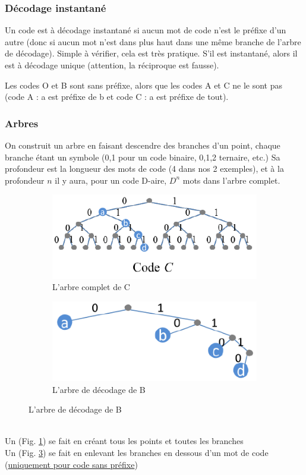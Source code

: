\documentclass[11pt,a4paper]{article}
\begin{document}
\subsubsection{Décodage instantané}
Un code est à décodage instantané si aucun mot de code n'est le préfixe d'un autre (donc si aucun mot n'est dans plus haut dans une même branche de l'arbre de décodage). Simple à vérifier, cela est très pratique. S'il est instantané, alors il est à décodage unique (attention, la réciproque est fausse).
\begin{exemple}
	Les codes O et B sont sans préfixe, alors que les codes A et C ne le sont pas (code A : a est préfixe de b et code C : a est préfixe de tout).
\end{exemple}
\subsubsection{Arbres}
On  construit un arbre en faisant descendre des branches d'un point, chaque branche étant un symbole (0,1 pour un code binaire, 0,1,2 ternaire, etc.) Sa profondeur est la longueur des mots de code (4 dans nos 2 exemples), et à la profondeur $n$ il y aura, pour un code D-aire, $D^n$ mots dans l'arbre complet. 
\begin{figure}[!h]
	\begin{subfigure}{0.46\linewidth}
		\centering
		\includegraphics[scale=0.65]{images/arbre_complet}
		\caption{L'arbre complet de C}
		\label{complet}
	\end{subfigure}
	\begin{subfigure}{0.46\linewidth}
		\centering
		\includegraphics[scale=0.75]{images/arbre_decodage}
		\caption{L'arbre de décodage de B}
		\label{decodage}
	\end{subfigure}
\end{figure}\\
Un  (Fig. \ref{complet}) se fait en créant tous les points et toutes les branches\\
Un  (Fig. \ref{decodage}) se fait en enlevant les branches en dessous d'un mot de code (\uline{uniquement pour code sans préfixe})
\end{document}
